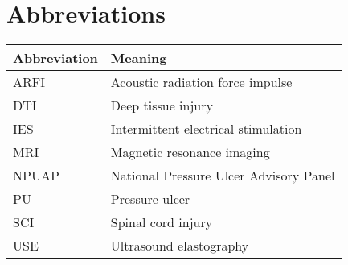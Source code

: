 	\section*{Abbreviations}
		\begin{longtable}[l]{ll}
			Abbreviation & Meaning \\
			\hline \endhead
			ARFI & Acoustic radiation force impulse \\
			DTI & Deep tissue injury \\
			IES & Intermittent electrical stimulation \\
			MRI & Magnetic resonance imaging \\
			NPUAP & National Pressure Ulcer Advisory Panel \\
			PU & Pressure ulcer \\
			SCI & Spinal cord injury \\
			USE & Ultrasound elastography \\
		\end{longtable}